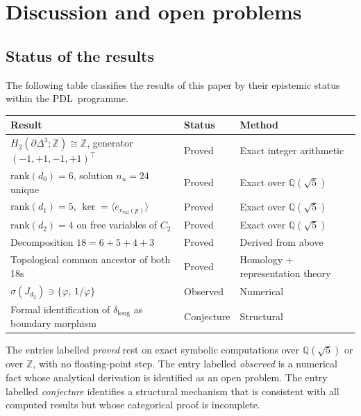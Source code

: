 \documentclass[11pt,a4paper]{article}
\theoremstyle{definition}
\newcommand{\PDL}{\textnormal{PDL}}
\newcommand{\rval}{r_{\mathrm{val}}}
\newcommand{\rank}{\mathrm{rank}}
\newcommand{\dmap}[1]{d_{#1}}
\newcommand{\dlong}{\delta_{\mathrm{long}}}
\newcommand{\vp}{\varphi}
\begin{document}
\section{Discussion and open problems}
\label{sec:discussion}

\subsection{Status of the results}
\label{subsec:status}

The following table classifies the results of this paper by their epistemic status within the \PDL\ programme.

\begin{center}
\begin{tabular}{lll}
\toprule
Result & Status & Method \\
\midrule
$H_2(\partial\Delta^3;\mathbb{Z}) \cong \mathbb{Z}$, generator $(-1,+1,-1,+1)^\top$ & Proved & Exact integer arithmetic \\
$\rank(\dmap{0}) = 6$, solution $n_u = 24$ unique & Proved & Exact over $\mathbb{Q}(\sqrt{5})$ \\
$\rank(\dmap{1}) = 5$, $\ker = \langle e_{\rval(p)}\rangle$ & Proved & Exact over $\mathbb{Q}(\sqrt{5})$ \\
$\rank(\dmap{2}) = 4$ on free variables of $C_2$ & Proved & Exact over $\mathbb{Q}(\sqrt{5})$ \\
Decomposition $18 = 6+5+4+3$ & Proved & Derived from above \\
Topological common ancestor of both 18s & Proved & Homology + representation theory \\
$\sigma(J_{\dmap{2}}) \ni \{\vp,\, 1/\vp\}$ & Observed & Numerical \\
Formal identification of $\dlong$ as boundary morphism & Conjecture & Structural \\
\bottomrule
\end{tabular}
\end{center}

\medskip\noindent The entries labelled \emph{proved} rest on exact symbolic computations over $\mathbb{Q}(\sqrt{5})$ or over $\mathbb{Z}$, with no floating-point step. The entry labelled \emph{observed} is a numerical fact whose analytical derivation is identified as an open problem. The entry labelled \emph{conjecture} identifies a structural mechanism that is consistent with all computed results but whose categorical proof is incomplete.
\end{document}

